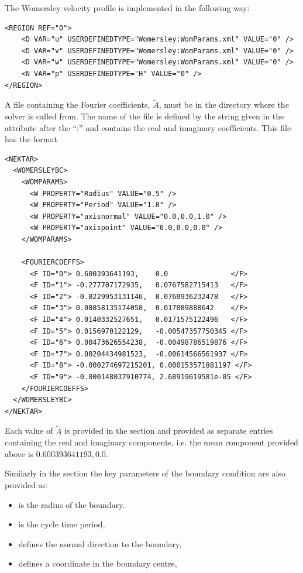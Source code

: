 The Womersley velocity profile is implemented in the following way:

\begin{lstlisting}[style=XMLStyle]
<REGION REF="0">
    <D VAR="u" USERDEFINEDTYPE="Womersley:WomParams.xml" VALUE="0" />
    <D VAR="v" USERDEFINEDTYPE="Womersley:WomParams.xml" VALUE="0" />
    <D VAR="w" USERDEFINEDTYPE="Womersley:WomParams.xml" VALUE="0" />
    <N VAR="p" USERDEFINEDTYPE="H" VALUE="0" />
</REGION>
\end{lstlisting}

A file containing the Fourier coefficients, $\tilde{A}$, must be in
the directory where the solver is called from. The name of the file is
defined by the string given in the attribute 
after the ``:'' and contains the real and imaginary coefficients. This
file has the format
\begin{lstlisting}[style=XMLStyle]
<NEKTAR>
  <WOMERSLEYBC>
    <WOMPARAMS>
      <W PROPERTY="Radius" VALUE="0.5" />
      <W PROPERTY="Period" VALUE="1.0" />
      <W PROPERTY="axisnormal" VALUE="0.0,0.0,1.0" />
      <W PROPERTY="axispoint" VALUE="0.0,0.0,0.0" />
    </WOMPARAMS>

    <FOURIERCOEFFS>
      <F ID="0"> 0.600393641193,    0.0               </F>
      <F ID="1"> -0.277707172935,   0.0767582715413   </F>
      <F ID="2"> -0.0229953131146,  0.0760936232478   </F>
      <F ID="3"> 0.00858135174058,  0.017089888642    </F>
      <F ID="4"> 0.0140332527651,   0.0171575122496   </F>
      <F ID="5"> 0.0156970122129,   -0.00547357750345 </F>
      <F ID="6"> 0.00473626554238,  -0.00498786519876 </F>
      <F ID="7"> 0.00204434981523,  -0.00614566561937 </F>
      <F ID="8"> -0.000274697215201, 0.000153571881197 </F>
      <F ID="9"> -0.000148037910774, 2.68919619581e-05 </F>
    </FOURIERCOEFFS>
  </WOMERSLEYBC>
</NEKTAR>
\end{lstlisting}

Each value of $\tilde{A}$ is provided in the 
section and provided as separate entries containing the real and
imaginary components, i.e. the mean component provided above is
$0.600393641193,0.0$.

Similarly in the  section the key parameters of the boundary condition are also provided as:
\begin{itemize}
\item {} is the radius of the boundary.
\item {} is the cycle time period,
\item {} defines the normal direction to the boundary,
\item {}  defines a coordinate in the boundary centre,
\end{itemize}



